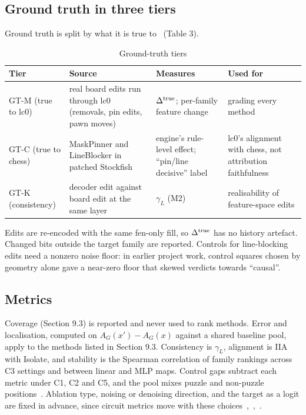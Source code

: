 \documentclass[conference]{IEEEtran}
\begin{document}
\subsection{Ground truth in three tiers}\label{sec:10.1}
Ground truth is split by what it is true to~\cite{chen2020} (Table 3).

\begin{table}[!t]
\centering
\renewcommand{\thetable}{3}
\caption{Ground-truth tiers}
\label{tab:3}
\footnotesize
\begin{tabularx}{\textwidth}{>{\raggedright\arraybackslash}p{2.4cm}>{\raggedright\arraybackslash}X>{\raggedright\arraybackslash}X>{\raggedright\arraybackslash}X}
\toprule
Tier & Source & Measures & Used for \\
\midrule
GT-M (true to lc0) & real board edits run through lc0 (removals, pin edits, pawn moves) & $\Delta^{\rm true}$; per-family feature change & grading every method \\
GT-C (true to chess) & MaskPinner and LineBlocker in patched Stockfish & engine's rule-level effect; ``pin/\allowbreak{}line decisive'' label & lc0's alignment with chess, not attribution faithfulness \\
GT-K (consistency) & decoder edit against board edit at the same layer & $\gamma_L$ (M2) & realisability of feature-space edits \\
\bottomrule
\end{tabularx}
\end{table}

Edits are re-encoded with the same fen-only fill, so $\Delta^{\rm true}$ has no history artefact. Changed bits outside the target family are reported. Controls for line-blocking edits need a nonzero noise floor: in earlier project work, control squares chosen by geometry alone gave a near-zero floor that skewed verdicts towards ``causal''.

\subsection{Metrics}\label{sec:10.2}
Coverage (Section 9.3) is reported and never used to rank methods. Error and localisation, computed on $A_G(x')-A_G(x)$ against a shared baseline pool, apply to the methods listed in Section 9.3. Consistency is $\gamma_L$, alignment is IIA with Isolate, and stability is the Spearman correlation of family rankings across C3 settings and between linear and MLP maps. Control gaps subtract each metric under C1, C2 and C5, and the pool mixes puzzle and non-puzzle positions~\cite{ramaswamy2023}. Ablation type, noising or denoising direction, and the target as a logit are fixed in advance, since circuit metrics move with these choices~\cite{zhang2024},~\cite{miller2024},~\cite{heimersheim2024}.
\end{document}
